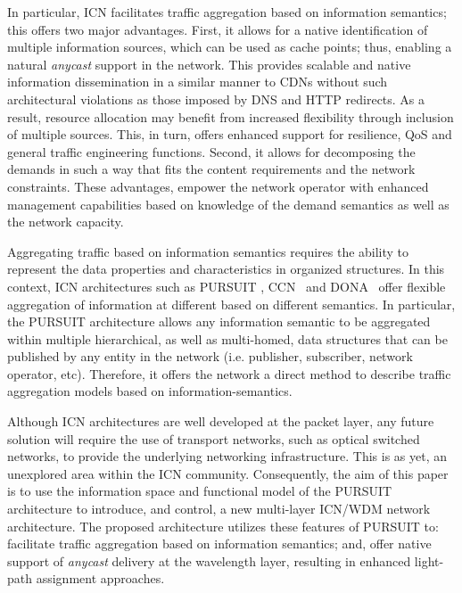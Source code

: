 \documentclass[journal]{IEEEtran}
\begin{document}
In particular, ICN facilitates traffic aggregation based on information semantics; this offers two major advantages. First, it allows for a native identification of multiple information sources, which can be used as cache points; thus, enabling a natural \emph{anycast} support in the network. This provides scalable and native information dissemination in a similar manner to CDNs without such architectural violations as those imposed by DNS and HTTP redirects. As a result, resource allocation may benefit from increased flexibility through inclusion of multiple sources. This, in turn, offers enhanced support for resilience, QoS and general traffic engineering functions.
Second, it allows for decomposing the demands in such a way that fits
the content requirements and the network constraints. These advantages, empower the network operator with enhanced management capabilities based on knowledge of the demand semantics as well as the network capacity.

Aggregating traffic based on information semantics requires the ability to represent the data properties and characteristics in organized structures.
In this context, ICN architectures such as PURSUIT
\cite{tro12:ICnet,tro:ICnet}, CCN~\cite{jac:ICnetCACM}
and DONA~\cite{kop:ICnet} offer flexible
aggregation of information at different based on different
semantics. In particular, the PURSUIT architecture allows any information semantic to be aggregated within multiple hierarchical, as well as multi-homed, data structures that can be published by any entity in the network (i.e. publisher, subscriber, network operator, etc). Therefore, it offers the network a direct method to describe traffic aggregation models based on information-semantics.

Although ICN architectures are well developed at the packet layer, any
future solution will require the use of
transport networks, such as optical switched networks, to provide the
underlying networking infrastructure. This is as yet, an unexplored
area within the ICN community. Consequently, the aim of this
paper is to use the information space and functional model of the PURSUIT architecture
to introduce, and control, a new multi-layer ICN/WDM network architecture. The proposed architecture utilizes these features of PURSUIT to: facilitate traffic aggregation based on information semantics; and, offer native support of \emph{anycast} delivery at the wavelength layer, resulting in enhanced light-path assignment approaches.
\end{document}
